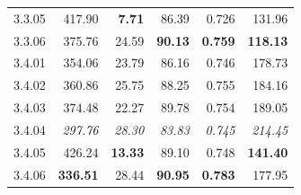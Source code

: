 \begin{table}[!t]
\begin{tabular}{@{}lrrrrr@{}}
    3.3.05 & 417.90 & \textbf{7.71} & 86.39 & 0.726 & 131.96 \\
    3.3.06 & 375.76 & 24.59 & \textbf{90.13} & \textbf{0.759} & \textbf{118.13} \\
    \noalign{\smallskip}
    3.4.01 & 354.06 & 23.79 & 86.16 & 0.746 & 178.73 \\
    3.4.02 & 360.86 & 25.75 & 88.25 & 0.755 & 184.16 \\
    3.4.03 & 374.48 & 22.27 & 89.78 & 0.754 & 189.05 \\
    3.4.04 & \textit{297.76} & \textit{28.30} & \textit{83.83} & \textit{0.745} & \textit{214.45} \\
    3.4.05 & 426.24 & \textbf{13.33} & 89.10 & 0.748 & \textbf{141.40} \\
    3.4.06 & \textbf{336.51} & 28.44 & \textbf{90.95} & \textbf{0.783} & 177.95 \\
\hline
\end{tabular}
\end{table}